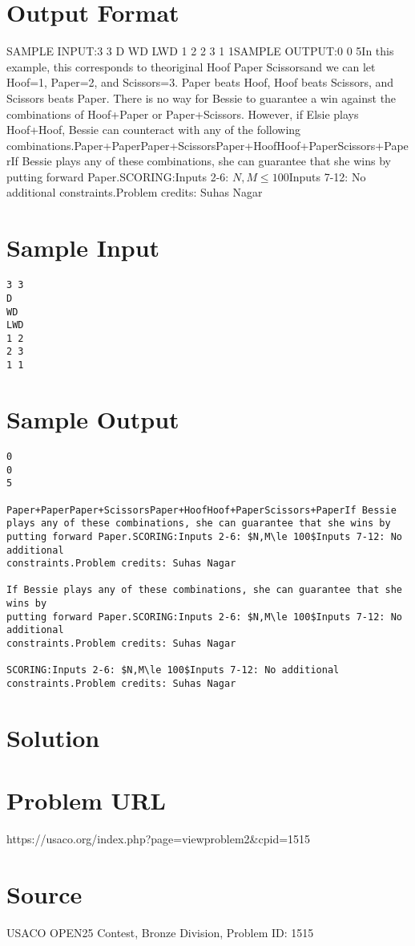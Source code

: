 \documentclass[12pt]{article}
\begin{document}
\section*{Output Format}
SAMPLE INPUT:3 3
D
WD
LWD
1 2
2 3
1 1SAMPLE OUTPUT:0
0
5In this example, this corresponds to theoriginal Hoof Paper
Scissorsand we can let Hoof=1, Paper=2, and Scissors=3. Paper beats Hoof,
Hoof beats Scissors, and Scissors beats Paper. There is no way for Bessie to
guarantee a win against the combinations of Hoof+Paper or Paper+Scissors.
However, if Elsie plays Hoof+Hoof, Bessie can counteract with any of the
following combinations.Paper+PaperPaper+ScissorsPaper+HoofHoof+PaperScissors+PaperIf Bessie plays any of these combinations, she can guarantee that she wins by
putting forward Paper.SCORING:Inputs 2-6: $N,M\le 100$Inputs 7-12: No additional
constraints.Problem credits: Suhas Nagar

\section*{Sample Input}
\begin{verbatim}
3 3
D
WD
LWD
1 2
2 3
1 1
\end{verbatim}

\section*{Sample Output}
\begin{verbatim}
0
0
5

Paper+PaperPaper+ScissorsPaper+HoofHoof+PaperScissors+PaperIf Bessie plays any of these combinations, she can guarantee that she wins by
putting forward Paper.SCORING:Inputs 2-6: $N,M\le 100$Inputs 7-12: No additional
constraints.Problem credits: Suhas Nagar

If Bessie plays any of these combinations, she can guarantee that she wins by
putting forward Paper.SCORING:Inputs 2-6: $N,M\le 100$Inputs 7-12: No additional
constraints.Problem credits: Suhas Nagar

SCORING:Inputs 2-6: $N,M\le 100$Inputs 7-12: No additional
constraints.Problem credits: Suhas Nagar
\end{verbatim}

\section*{Solution}


\section*{Problem URL}
https://usaco.org/index.php?page=viewproblem2&cpid=1515

\section*{Source}
USACO OPEN25 Contest, Bronze Division, Problem ID: 1515
\end{document}

